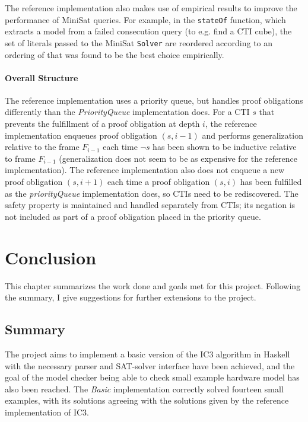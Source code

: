 \documentclass[12pt,a4paper,twoside,openright]{report}
\begin{document}
{The reference implementation also makes use of empirical results to improve the performance of MiniSat queries.
For example, in the \verb,stateOf, function, which extracts a model from a failed consecution query
(to e.g. find a CTI cube), the set of literals passed to the MiniSat \verb,Solver, are reordered according
to an ordering of that was found to be the best choice empirically.

\subsubsection{Overall Structure}

The reference implementation uses a priority queue, but handles proof obligations differently
than the {\it PriorityQueue} implementation does. For a CTI $s$ that prevents the fulfillment
of a proof obligation at depth $i$, the reference implementation enqueues proof obligation $(s,i - 1)$
and performs generalization relative to the frame $F_{i - 1}$ each time $\neg s$ has been shown
to be inductive relative to frame $F_{i - 1}$ (generalization does not seem
to be as expensive for the reference implementation).
The reference implementation also does not
enqueue a new proof obligation $(s, i+1)$ each time a proof obligation $(s, i)$ has been
fulfilled as the {\it priorityQueue} implementation does, so CTIs need to be rediscovered.
The safety property is maintained and
handled separately from CTIs; its negation is not included as part of a proof obligation
placed in the priority queue.

\chapter{Conclusion}

This chapter summarizes the work done and goals met for this project. Following the summary, I give
suggestions for further extensions to the project.

\section{Summary}

The project aims to implement a basic version of the IC3 algorithm in Haskell with the necessary parser
and SAT-solver interface have been achieved, and the goal of the model checker being able to check
small example hardware model has also been reached. The \emph{Basic} implementation correctly
solved fourteen small examples, with its solutions agreeing with the solutions given by the
reference implementation of IC3.

}
\end{document}
